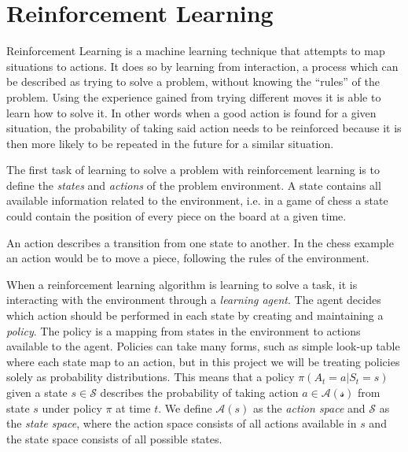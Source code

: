 \documentclass[11pt]{article}
\begin{document}
\maketitle

\section{Reinforcement Learning}

Reinforcement Learning is a machine learning technique that attempts 
to map situations to actions.
It does so by learning from interaction, a process which can be described as trying to solve a problem,
without knowing the “rules” of the problem.
Using the experience gained from trying different moves it is able to learn how to solve it.
In other words when a good action is found for a given situation,
the probability of taking said action needs to be reinforced because it is then more likely to be
repeated in the future for a similar situation.

The first task of learning to solve a problem with reinforcement learning is to define
the \textit{states} and \textit{actions} of the problem environment.
A state contains all available information related to the environment,
i.e. in a game of chess a state could contain the position of every piece on the board at
a given time.

An action describes a transition from one state to another.
In the chess example an action would be to move a piece, following the rules of the
environment.

When a reinforcement learning algorithm is learning to solve a task, it is
interacting with the environment through a \textit{learning agent}.
The agent decides which action should be performed in each state by creating and maintaining a \textit{policy}.
The policy is a mapping from states in the environment to actions available to the agent\cite{RLbook}.
Policies can take many forms, such as simple look-up table where each state map to an
action, but in this project we will be treating policies solely as probability distributions.
This means that a policy $\pi(A_t = a|S_t = s)$ given a state $s \in \mathcal{S}$ describes the
probability of taking action $a \in \mathcal{A(s)}$ from state $s$ under policy $\pi$ at time $t$.
We define $\mathcal{A}(s)$ as the \textit{action space} and $\mathcal{S}$ as the \textit{state space},
where the action space consists of all actions available in $s$ and the state space consists of
all possible states.
\end{document}
